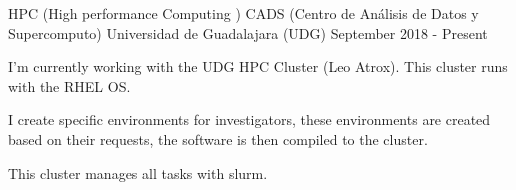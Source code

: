 \begin{cventries}
  
  \cventry
    {HPC (High performance Computing )}
    {CADS (Centro de Análisis de Datos y Supercomputo)}
    {Universidad de Guadalajara (UDG)}
    {September 2018 - Present}
    {
      \begin{cvitems}
        \item {I'm currently working with the UDG HPC Cluster (Leo Atrox). This cluster runs with the RHEL OS.}
        \item {I create specific environments for investigators, these environments are created based on their requests, the software is then compiled to the cluster.}
        \item {This cluster manages all tasks with slurm.}
      \end{cvitems}
    }


\end{cventries}
